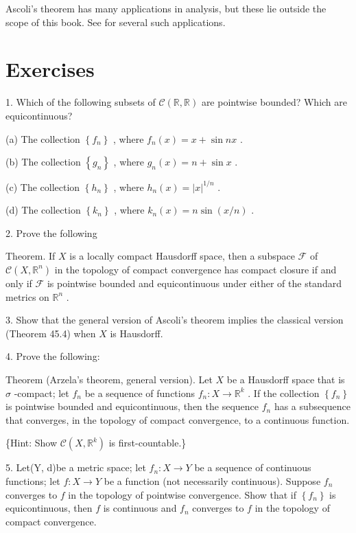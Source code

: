 Ascoli's theorem has many applications in analysis, but these lie outside the scope of this book. See 		\cite{KolmogorovFomin1957} for several such applications.

\section*{Exercises}

1. Which of the following subsets of \(\mathcal{C}\left( {\mathbb{R},\mathbb{R}}\right)\) are pointwise bounded? Which are equicontinuous?

(a) The collection \(\left\{  {f}_{n}\right\}\) , where \({f}_{n}\left( x\right)  = x + \sin {nx}\) .

(b) The collection \(\left\{  {g}_{n}\right\}\) , where \({g}_{n}\left( x\right)  = n + \sin x\) .

(c) The collection \(\left\{  {h}_{n}\right\}\) , where \({h}_{n}\left( x\right)  = {\left| x\right| }^{1/n}\) .

(d) The collection \(\left\{  {k}_{n}\right\}\) , where \({k}_{n}\left( x\right)  = n\sin \left( {x/n}\right)\) .

2. Prove the following

Theorem. If \(X\) is a locally compact Hausdorff space, then a subspace \(\mathcal{F}\) of \(\mathcal{C}\left( {X,{\mathbb{R}}^{n}}\right)\) in the topology of compact convergence has compact closure if and only if \(\mathcal{F}\) is pointwise bounded and equicontinuous under either of the standard metrics on \({\mathbb{R}}^{n}\) .

3. Show that the general version of Ascoli's theorem implies the classical version (Theorem 45.4) when \(X\) is Hausdorff.

4. Prove the following:

Theorem (Arzela’s theorem, general version). Let \(X\) be a Hausdorff space that is \(\sigma\) -compact; let \({f}_{n}\) be a sequence of functions \({f}_{n} : X \rightarrow  {\mathbb{R}}^{k}\) . If the collection \(\left\{  {f}_{n}\right\}\) is pointwise bounded and equicontinuous, then the sequence \({f}_{n}\) has a subsequence that converges, in the topology of compact convergence, to a continuous function.

\{Hint: Show \(\mathcal{C}\left( {X,{\mathbb{R}}^{k}}\right)\) is first-countable.\}

5. Let(Y, d)be a metric space; let \({f}_{n} : X \rightarrow  Y\) be a sequence of continuous functions; let \(f : X \rightarrow  Y\) be a function (not necessarily continuous). Suppose \({f}_{n}\) converges to \(f\) in the topology of pointwise convergence. Show that if \(\left\{  {f}_{n}\right\}\) is equicontinuous, then \(f\) is continuous and \({f}_{n}\) converges to \(f\) in the topology of compact convergence.
